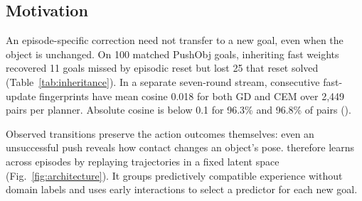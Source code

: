\subsection{Motivation}
\label{sec:problem}
\label{sec:setting}
\label{sec:diagnosis}

An episode-specific correction need not transfer to a new goal, even when the object is unchanged. On 100 matched PushObj goals, inheriting fast weights recovered 11 goals missed by episodic reset but lost 25 that reset solved (Table~\ref{tab:inheritance}). In a separate seven-round stream, consecutive fast-update fingerprints have mean cosine 0.018 for both GD and CEM over 2,449 pairs per planner. Absolute cosine is below 0.1 for 96.3\% and 96.8\% of pairs ().

Observed transitions preserve the action outcomes themselves: even an unsuccessful push reveals how contact changes an object's pose. \ours therefore learns across episodes by replaying trajectories in a fixed latent space (Fig.~\ref{fig:architecture}). It groups predictively compatible experience without domain labels and uses early interactions to select a predictor for each new goal.
